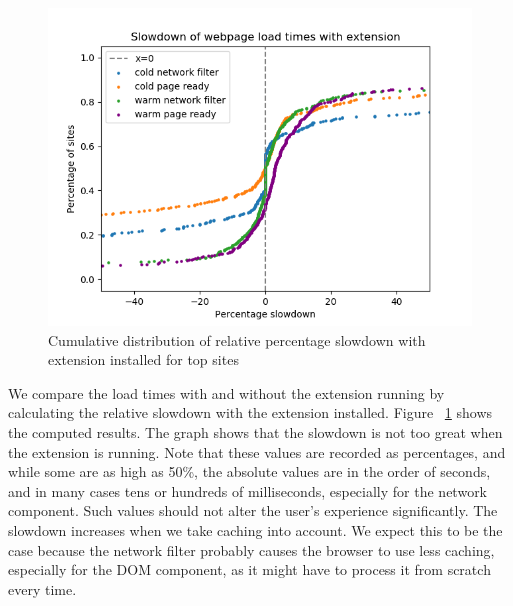 \begin{figure}[h]
	\includegraphics[scale=0.5]{results/extension_slowdown_overall}
	\caption{Cumulative distribution of relative percentage slowdown with extension installed for top sites}
	\label{fig:overall_slowdown}
\end{figure}

We compare the load times with and without the extension running by calculating the relative slowdown with the extension installed. Figure ~\ref{fig:overall_slowdown} shows the computed results. The graph shows that the slowdown is not too great when the extension is running. Note that these values are recorded as percentages, and while some are as high as 50\%, the absolute values are in the order of seconds, and in many cases tens or hundreds of milliseconds, especially for the network component. Such values should not alter the user's experience significantly. The slowdown increases when we take caching into account. We expect this to be the case because the network filter probably causes the browser to use less caching, especially for the DOM component, as it might have to process it from scratch every time.


